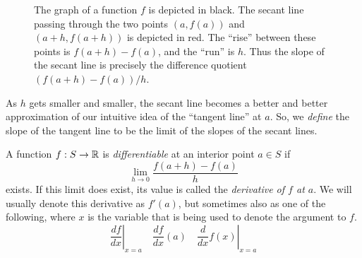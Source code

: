 \begin{figure}[ht]
	\begin{center}
\end{center}
\caption{The graph of a function $f$ is depicted in black. The secant line passing through the two points $(a, f(a))$ and $(a+h, f(a+h))$ is depicted in red. The ``rise'' between these points is $f(a+h)-f(a)$, and the ``run'' is $h$. Thus the slope of the secant line is precisely the difference quotient $(f(a+h)-f(a))/h$.}  \label{figure-difference-quotient}
\end{figure}

As $h$ gets smaller and smaller, the secant line becomes a better and better approximation of our intuitive idea of the ``tangent line'' at $a$. So, we \emph{define} the slope of the tangent line to be the limit of the slopes of the secant lines. 

\begin{definition} \label{derivative-definition-single}  
	A function $f : S \to \mathbb{R}$ is \emph{differentiable} at an interior point $a \in S$ if 
	\[ \lim_{h \to 0} \frac{f(a+h) - f(a)}{h} \]
	exists. If this limit does exist, its value is called the \emph{derivative of $f$ at $a$}. We will usually denote this derivative as $f'(a)$, but sometimes also as one of the following, where $x$ is the variable that is being used to denote the argument to $f$.  
	\[ \left.\frac{df}{dx}\right|_{x = a} \quad \frac{df}{dx} (a) \quad \left.\frac{d}{dx} f(x)\right|_{x = a} \] 
\end{definition}

